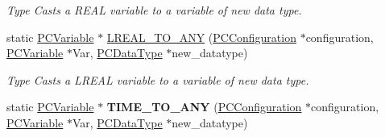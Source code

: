 \begin{DoxyCompactItemize}
\begin{DoxyCompactList}\small\item\em Type Casts a R\+E\+AL variable to a variable of new data type. \end{DoxyCompactList}\item 
static \hyperlink{classpc__emulator_1_1PCVariable}{P\+C\+Variable} $\ast$ \hyperlink{classpc__emulator_1_1Utils_ab4385bfebe2ad37daa6ee7451c8639e2}{L\+R\+E\+A\+L\+\_\+\+T\+O\+\_\+\+A\+NY} (\hyperlink{classpc__emulator_1_1PCConfiguration}{P\+C\+Configuration} $\ast$configuration, \hyperlink{classpc__emulator_1_1PCVariable}{P\+C\+Variable} $\ast$Var, \hyperlink{classpc__emulator_1_1PCDataType}{P\+C\+Data\+Type} $\ast$new\+\_\+datatype)
\begin{DoxyCompactList}\small\item\em Type Casts a L\+R\+E\+AL variable to a variable of new data type. \end{DoxyCompactList}\item 
static \hyperlink{classpc__emulator_1_1PCVariable}{P\+C\+Variable} $\ast$ {\bfseries T\+I\+M\+E\+\_\+\+T\+O\+\_\+\+A\+NY} (\hyperlink{classpc__emulator_1_1PCConfiguration}{P\+C\+Configuration} $\ast$configuration, \hyperlink{classpc__emulator_1_1PCVariable}{P\+C\+Variable} $\ast$Var, \hyperlink{classpc__emulator_1_1PCDataType}{P\+C\+Data\+Type} $\ast$new\+\_\+datatype)\hypertarget{classpc__emulator_1_1Utils_ad07d3247bcf2ccf5bc208ae457f0db49}{}\label{classpc__emulator_1_1Utils_ad07d3247bcf2ccf5bc208ae457f0db49}


\end{DoxyCompactItemize}
